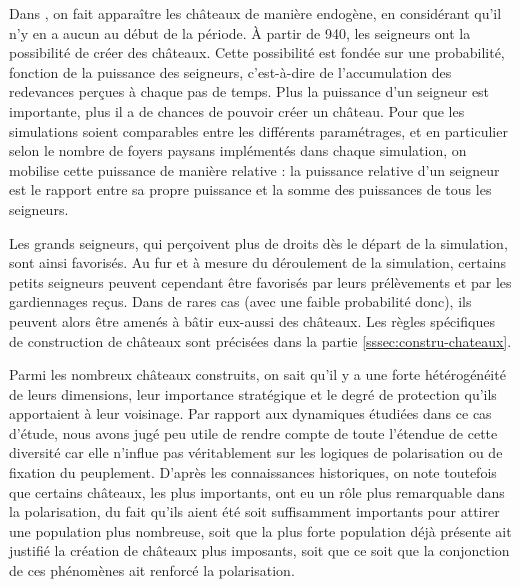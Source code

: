 \begin{tcolorbox}[breakable,left=0pt,right=0pt,top=0pt,bottom=0pt,
	colback=gray!15,colframe=gray!15,width=\dimexpr\textwidth\relax, 
	enlarge left by=0mm, boxsep=5pt,arc=0pt,outer arc=0pt, parbox=false]
	
	Dans \simfeodal{}, on fait apparaître les châteaux de manière endogène, en considérant qu'il n'y en a aucun au début de la période.
	À partir de 940, les seigneurs ont la possibilité de créer des châteaux.
	Cette possibilité est fondée sur une probabilité, fonction de la puissance des seigneurs, c'est-à-dire de l'accumulation des redevances perçues à chaque pas de temps.
	Plus la puissance d'un seigneur est importante, plus il a de chances de pouvoir créer un château.
	Pour que les simulations soient comparables entre les différents paramétrages, et en particulier selon le nombre de foyers paysans implémentés dans chaque simulation, on mobilise cette puissance de manière relative : la puissance relative d'un seigneur est le rapport entre sa propre puissance et la somme des puissances de tous les seigneurs.
	
	Les grands seigneurs, qui perçoivent plus de droits dès le départ de la simulation, sont ainsi favorisés.
	Au fur et à mesure du déroulement de la simulation, certains petits seigneurs peuvent cependant être favorisés par leurs prélèvements et par les gardiennages reçus.
	Dans de rares cas (avec une faible probabilité donc), ils peuvent alors être amenés à bâtir eux-aussi des châteaux.
	Les règles spécifiques de construction de châteaux sont précisées dans la partie \cref{sssec:constru-chateaux}.
	
\end{tcolorbox}

Parmi les nombreux châteaux construits, on sait qu'il y a une forte hétérogénéité de leurs dimensions, leur importance stratégique et le degré de protection qu'ils apportaient à leur voisinage.
Par rapport aux dynamiques étudiées dans ce cas d'étude, nous avons jugé peu utile de rendre compte de toute l'étendue de cette diversité car elle n'influe pas véritablement sur les logiques de polarisation ou de fixation du peuplement.
D'après les connaissances historiques, on note toutefois que certains châteaux, les plus importants, ont eu un rôle plus remarquable dans la polarisation, du fait qu'ils aient été soit suffisamment importants pour attirer une population plus nombreuse, soit que la plus forte population déjà présente ait justifié la création de châteaux plus imposants, soit que ce soit que la conjonction de ces phénomènes ait renforcé la polarisation.


